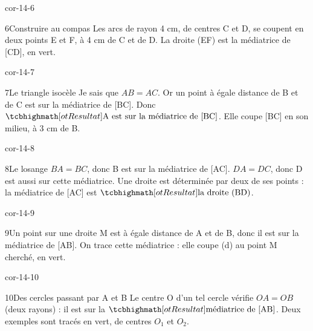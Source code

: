 \begin{blocLivre}{cor-14-6}\begin{corrige}{6}{Construire au compas}
Les arcs de rayon 4 cm, de centres C et D, se coupent en deux points E et F, à 4 cm de C et de D. La droite (EF) est la médiatrice de [CD], en vert.
\label{fig-cor-14-6}
\end{corrige}\end{blocLivre}
\begin{blocLivre}{cor-14-7}\begin{corrige}{7}{Le triangle isocèle}
Je sais que $AB=AC$. Or un point à égale distance de B et de C est sur la médiatrice de [BC]. Donc $\res{\text{A est sur la médiatrice de [BC]}}$. Elle coupe [BC] en son milieu, à 3 cm de B.
\label{fig-cor-14-7}
\end{corrige}\end{blocLivre}
\begin{blocLivre}{cor-14-8}\begin{corrige}{8}{Le losange}
$BA=BC$, donc B est sur la médiatrice de [AC]. $DA=DC$, donc D est aussi sur cette médiatrice. Une droite est déterminée par deux de ses points : la médiatrice de [AC] est $\res{\text{la droite (BD)}}$.
\label{fig-cor-14-8}
\end{corrige}\end{blocLivre}
\begin{blocLivre}{cor-14-9}\begin{corrige}{9}{Un point sur une droite}
M est à égale distance de A et de B, donc il est sur la médiatrice de [AB]. On trace cette médiatrice : elle coupe (d) au point M cherché, en vert.
\label{fig-cor-14-9}
\end{corrige}\end{blocLivre}
\begin{blocLivre}{cor-14-10}\begin{corrige}{10}{Des cercles passant par A et B}
Le centre O d’un tel cercle vérifie $OA=OB$ (deux rayons) : il est sur la $\res{\text{médiatrice de [AB]}}$. Deux exemples sont tracés en vert, de centres $O_1$ et $O_2$.
\label{fig-cor-14-10}
\end{corrige}\end{blocLivre}
